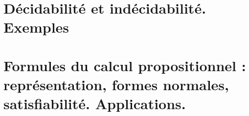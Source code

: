 %
%
%
%
%
%
%
%
%

\chapter{Décidabilité et indécidabilité. Exemples} \label{L32}


\chapter{Formules du calcul propositionnel : représentation, formes normales, satisfiabilité. Applications.} \label{L33}


%
 


